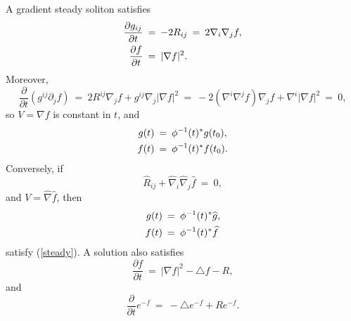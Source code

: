 A gradient steady soliton satisfies
\begin{align} \label{steady}
\frac{\partial g_{ij}}{\partial t}\: & = \:-2R_{ij}\:=\:
2\nabla_i\nabla_jf,\\
\frac{\partial f}{\partial t}\: & = \:|\nabla f|^2. \notag
\end{align}
Moreover,
\begin{equation}
\frac{\partial}{\partial t}(g^{ij}\partial_jf)\:=\:
2R^{ij}\nabla_jf+g^{ij}\nabla_j|\nabla f|^2
\:=\:-2(\nabla^i\nabla^jf)\nabla_jf+\nabla^i|\nabla f|^2\:=\:0,
\end{equation}
so $V=\nabla f$ is constant in $t$, and
\begin{align} \label{steadysoln}
g(t)\: & = \:\phi^{-1}(t)^*g(t_0),\\
f(t)\: & = \:\phi^{-1}(t)^*f(t_0). \notag
\end{align}
Conversely, if
\begin{equation}
\widehat R_{ij}+\widehat\nabla_i\widehat\nabla_j\widehat f\:=\:0,
\end{equation}
and $V=\widehat\nabla\widehat f$, then
\begin{align}
g(t)\: & = \:\phi^{-1}(t)^*\widehat g,\\
f(t)\: & = \:\phi^{-1}(t)^*\widehat f \notag
\end{align}
satisfy (\ref{steady}). A solution also satisfies
\begin{equation}
\frac{\partial f}{\partial t}\:=\:|\nabla f|^2-\triangle f-R,
\end{equation}
and
\begin{equation}
\frac{\partial}{\partial t}e^{-f}\:=\:-\triangle e^{-f}+Re^{-f}.
\end{equation}

